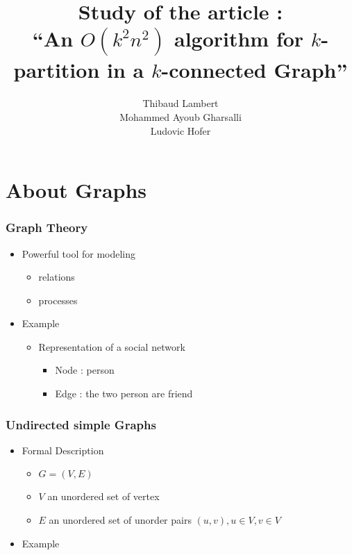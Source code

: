 \documentclass[xcolor=dvipsnames]{beamer}
\title[$O(k^2n^2)$ algorithm for $k$-partitionning]{Study of the article :\\``An $O(k^2n^2)$ algorithm for $k$-partition in a $k$-connected Graph''}
\author[Lambert, Gharsalli, Hofer]
       {Thibaud Lambert\\Mohammed Ayoub Gharsalli\\Ludovic Hofer}
\institute{University of Bordeaux}
\begin{document}
\begin{frame}[plain]
  \maketitle
\end{frame}

\begin{frame}[plain]
  \tableofcontents
\end{frame}

\section{About Graphs}

\begin{frame}
  \frametitle{Graph Theory}
  \begin{itemize}
  \item Powerful tool for modeling
    \begin{itemize}
    \item relations
    \item processes
    \end{itemize}
  \item Example
    \begin{itemize}
    \item Representation of a social network
      \begin{itemize}
      \item Node : person
      \item Edge : the two person are friend
      \end{itemize}
    \end{itemize}
  \end{itemize}
\end{frame}

\begin{frame}
  \frametitle{Undirected simple Graphs}
  \begin{itemize}
    \item Formal Description
      \begin{itemize}
      \item $G = (V,E)$
      \item $V$ an unordered set of vertex
      \item $E$ an unordered set of unorder pairs $(u,v), u \in V, v \in V$
      \end{itemize}
    \item Example
  \end{itemize}
\end{frame}
\end{document}
